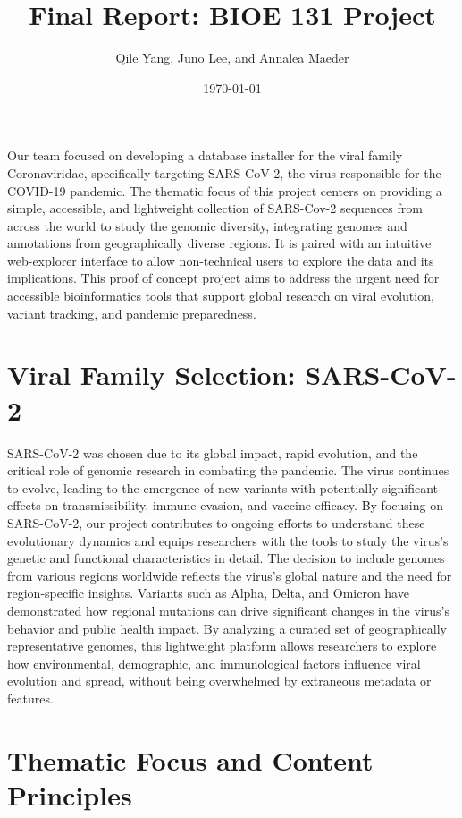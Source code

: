 \documentclass[11pt]{article}
\title{Final Report: BIOE 131 Project}
\author{Qile Yang, Juno Lee, and Annalea Maeder}
\date{\today}
\begin{document}
\maketitle

Our team focused on developing a database installer for the viral family Coronaviridae, specifically targeting SARS-CoV-2,
the virus responsible for the COVID-19 pandemic. The thematic focus of this project centers on providing a simple,
accessible, and lightweight collection of SARS-Cov-2 sequences from across the world
to study the genomic diversity, integrating genomes and annotations from geographically diverse regions.
It is paired with an intuitive web-explorer interface to allow non-technical users to explore the data and its implications.
This proof of concept project aims to address the urgent need for accessible bioinformatics tools that support global research on viral
evolution, variant tracking, and pandemic preparedness. \\

\section{Viral Family Selection: SARS-CoV-2}

SARS-CoV-2 was chosen due to its global impact, rapid evolution, and the critical role of genomic research in combating
the pandemic. The virus continues to evolve, leading to the emergence of new variants with potentially significant effects
on transmissibility, immune evasion, and vaccine efficacy. By focusing on SARS-CoV-2, our project contributes to ongoing
efforts to understand these evolutionary dynamics and equips researchers with the tools to study the virus's genetic and
functional characteristics in detail. The decision to include genomes from various regions worldwide reflects the virus's
global nature and the need for region-specific insights. Variants such as Alpha, Delta, and Omicron have demonstrated how
regional mutations can drive significant changes in the virus's behavior and public health impact. By analyzing a curated
set of geographically representative genomes, this lightweight platform allows researchers to explore how environmental,
demographic, and immunological factors influence viral evolution and spread, without being overwhelmed by extraneous
metadata or features.

\section{Thematic Focus and Content Principles}
\end{document}
